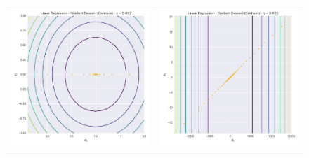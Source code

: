 \documentclass[12pt]{article}
\begin{document}
\newpage
\begin{figure}[!htb]
\begin{tabular}{cc}
\includegraphics[scale=0.3]{linear8.png} & 
\includegraphics[scale=0.3]{linear9.png} \\

\end{tabular}
\end{figure}
\end{document}
